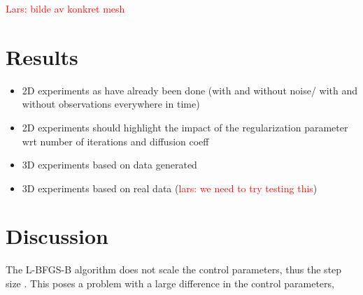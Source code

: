 \documentclass[11pt,a4paper]{article}
\renewcommand{\comment}[1]{\textcolor{red}{#1}}
\begin{document}
\comment{Lars: bilde av konkret mesh  }

\section{Results}
\begin{itemize}
\item 2D experiments as have already been done (with and without noise/ with and without observations everywhere in time) 
\item 2D experiments should highlight the impact of the regularization parameter wrt number of iterations and diffusion 
coeff 
\item 3D experiments based on data generated  
\item 3D experiments based on real data (\comment{lars: we need to try testing this}) 
\end{itemize}



\section{Discussion}




The L-BFGS-B algorithm does not scale the control parameters, thus the step size . This poses a problem with a large difference in the control parameters, 







\end{document}
